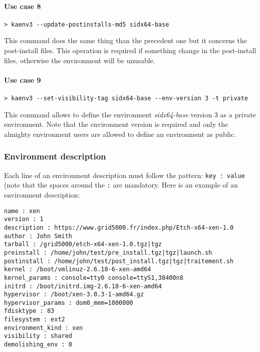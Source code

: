 \documentclass[a4wide,10pt,oneside]{book}
\begin{document}
\paragraph{Use case 8}
\begin{verbatim}
> kaenv3 --update-postinstalls-md5 sidx64-base
\end{verbatim}
This command does the same thing than the precedent one but it concerns the post-install files. This operation is required if something change in the post-install files, otherwise the environment will be unusable.

\paragraph{Use case 9}
\begin{verbatim}
> kaenv3 --set-visibility-tag sidx64-base --env-version 3 -t private
\end{verbatim}
This command allows to define the environment \textit{sidx64-base} version 3 as a private environment. Note that the environment version is required and only the almighty environment users are allowed to define an environment as public.

\subsubsection{Environment description}\label{sec:env_desc}
Each line of an environment description must follow the pattern: \texttt{key : value} (note that the spaces around the \texttt{:} are mandatory.
Here is an example of an environment description:
\begin{small}
\begin{verbatim}
name : xen
version : 1
description : https://www.grid5000.fr/index.php/Etch-x64-xen-1.0
author : John Smith
tarball : /grid5000/etch-x64-xen-1.0.tgz|tgz
preinstall : /home/john/test/pre_install.tgz|tgz|launch.sh
postinstall : /home/john/test/post_install.tgz|tgz|traitement.sh
kernel : /boot/vmlinuz-2.6.18-6-xen-amd64
kernel_params : console=tty0 console=ttyS1,38400n8
initrd : /boot/initrd.img-2.6.18-6-xen-amd64
hypervisor : /boot/xen-3.0.3-1-amd64.gz
hypervisor_params : dom0_mem=1000000
fdisktype : 83
filesystem : ext2
environment_kind : xen
visibility : shared
demolishing_env : 0
\end{verbatim}
\end{small}
\end{document}
